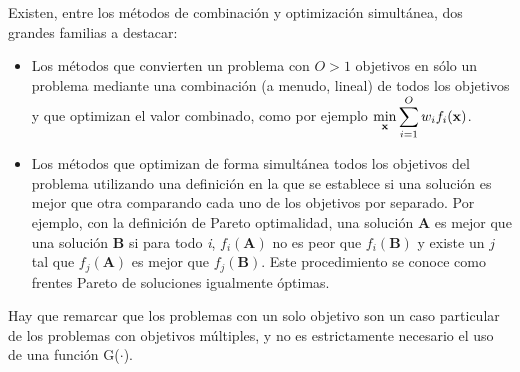 Existen, entre los métodos de combinación y optimización simultánea, dos grandes familias a destacar:
\begin{itemize}
    \item Los métodos que convierten un problema con $\textit{O}>1$ objetivos en sólo un problema mediante una combinación (a menudo, lineal) de todos los objetivos y que optimizan el valor combinado, como por ejemplo $\displaystyle \min\limits_{\textbf{x}} \sum_{i=1}^{O} w_i f_i(\textbf{x})$.
    \item Los métodos que optimizan de forma simultánea todos los objetivos del problema utilizando una definición en la que se establece si una solución es mejor que otra comparando cada uno de los objetivos por separado. Por ejemplo, con la definición de Pareto optimalidad, una solución \textbf{A} es mejor que una solución \textbf{B} si para todo \textit{i}, $f_i\left(\textbf{A}\right)$ no es peor que $f_i\left(\textbf{B}\right)$ y existe un $j$ tal que $f_j\left(\textbf{A}\right)$ es mejor que $f_j\left(\textbf{B}\right)$. Este procedimiento se conoce como frentes Pareto de soluciones igualmente óptimas.
\end{itemize}

Hay que remarcar que los problemas con un solo objetivo son un caso particular de los problemas con objetivos múltiples, y no es estrictamente necesario el uso de una función G($\cdot$).

